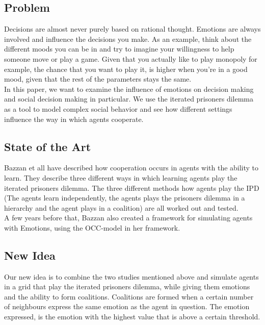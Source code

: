 \subsection*{Problem}
Decisions are almost never purely based on rational thought. Emotions are always involved and influence the decisions you make. As an example, think about the different moods you can be in and try to imagine your willingness to help someone move or play a game. Given that you actually like to play monopoly for example, the chance that you want to play it, is higher when you're in a good mood, given that the rest of the parameters stays the same. \\
In this paper, we want to examine the influence of emotions on decision making and social decision making in particular. We use the iterated prisoners dilemma as a tool to model complex social behavior and see how different settings influence the way in which agents cooperate.

\subsection*{State of the Art}
Bazzan et all have described how cooperation occurs in agents with the ability to learn. They describe three different ways in which learning agents play the iterated prisoners dilemma. The three different methods how agents play the IPD (The agents learn independently, the agents plays the prisoners dilemma in a hierarchy and the agent plays in a coalition) are all worked out and tested. \\
A few years before that, Bazzan also created a framework for simulating agents with Emotions, using the OCC-model in her framework. 

\subsection*{New Idea}
Our new idea is to combine the two studies mentioned above and simulate agents in a grid that play the iterated prisoners dilemma, while giving them emotions and the ability to form coalitions. Coalitions are formed when a certain number of neighbours express the same emotion as the agent in question. The emotion expressed, is the emotion with the highest value that is above a certain threshold.
